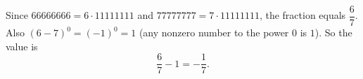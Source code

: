 Since $66666666=6\cdot11111111$ and $77777777=7\cdot11111111$, the fraction equals $\dfrac{6}{7}$. Also $(6-7)^0=(-1)^0=1$ (any nonzero number to the power $0$ is $1$). So the value is
\[
\dfrac{6}{7}-1=\boxed{-\dfrac{1}{7}}.
\]
